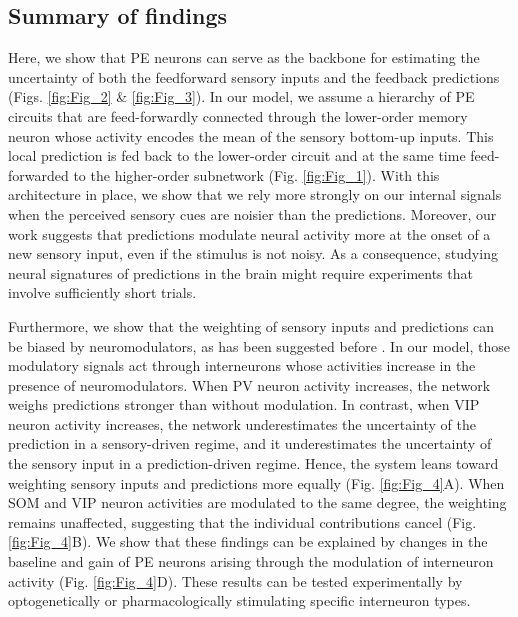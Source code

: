 \documentclass[10pt,a4paper]{article}
\begin{document}

\subsection*{Summary of findings}

Here, we show that PE neurons can serve as the backbone for estimating the uncertainty of both the feedforward sensory inputs and the feedback predictions (Figs. \ref{fig:Fig_2} \& \ref{fig:Fig_3}). In our model, we assume a hierarchy of PE circuits that are feed-forwardly connected through the lower-order memory neuron whose activity encodes the mean of the sensory bottom-up inputs. This local prediction is fed back to the lower-order circuit and at the same time feed-forwarded to the higher-order subnetwork (Fig. \ref{fig:Fig_1}). With this architecture in place, we show that we rely more strongly on our internal signals when the perceived sensory cues are noisier than the predictions. Moreover, our work suggests that predictions modulate neural activity more at the onset of a new sensory input, even if the stimulus is not noisy. 
As a consequence, studying neural signatures of predictions in the brain might require experiments that involve sufficiently short trials.

Furthermore, we show that the weighting of sensory inputs and predictions can be biased by neuromodulators, as has been suggested before \citep[see, e.g.,][]{yon2021precision}. In our model, those modulatory signals act through interneurons \citep{cardin2019functional} whose activities increase in the presence of neuromodulators. When PV neuron activity increases, the network weighs predictions stronger than without modulation. In contrast, when VIP neuron activity increases, the network underestimates the uncertainty of the prediction in a sensory-driven regime, and it underestimates the uncertainty of the sensory input in a prediction-driven regime. Hence, the system leans toward weighting sensory inputs and predictions more equally (Fig. \ref{fig:Fig_4}A). When SOM and VIP neuron activities are modulated to the same degree, the weighting remains unaffected, suggesting that the individual contributions cancel (Fig. \ref{fig:Fig_4}B). We show that these findings can be explained by changes in the baseline and gain of PE neurons arising through the modulation of interneuron activity (Fig. \ref{fig:Fig_4}D). These results can be tested experimentally by optogenetically or pharmacologically stimulating specific interneuron types.  
\end{document}
